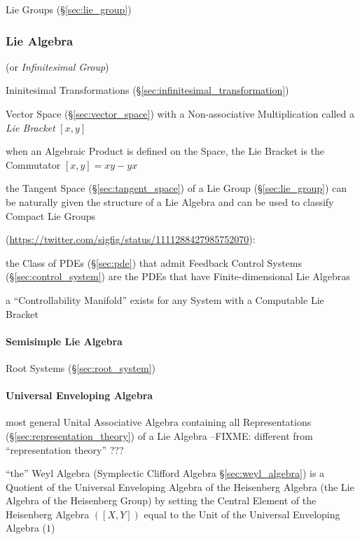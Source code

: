 Lie Groups (\S\ref{sec:lie_group})



\subsubsection{Lie Algebra}\label{sec:lie_algebra}

(or \emph{Infinitesimal Group})

Ininitesimal Transformations
(\S\ref{sec:infinitesimal_transformation})

Vector Space (\S\ref{sec:vector_space}) with a Non-associative
Multiplication called a \emph{Lie Bracket} $[x,y]$

when an Algebraic Product is defined on the Space, the Lie Bracket is
the Commutator $[x,y] = xy - yx$ %

the Tangent Space (\S\ref{sec:tangent_space}) of a Lie Group
(\S\ref{sec:lie_group}) can be naturally given the structure of a Lie Algebra
and can be used to classify Compact Lie Groups

(\url{https://twitter.com/sigfig/status/1111288427985752070}):

the Class of PDEs (\S\ref{sec:pde}) that admit Feedback Control Systems
(\S\ref{sec:control_system}) are the PDEs that have Finite-dimensional Lie
Algebras

a ``Controllability Manifold'' exists for any System with a Computable Lie
Bracket



\paragraph{Semisimple Lie Algebra}\label{sec:semisimple_lie}\hfill

Root Systems (\S\ref{sec:root_system})



\paragraph{Universal Enveloping Algebra}
\label{sec:universal_enveloping_algebra}\hfill

most general Unital Associative Algebra containing all Representations
(\S\ref{sec:representation_theory}) of a Lie Algebra
--FIXME: different from ``representation theory'' ???

\fist ``the'' Weyl Algebra (Symplectic Clifford Algebra
\S\ref{sec:weyl_algebra}) is a Quotient of the Universal Enveloping Algebra of
the Heisenberg Algebra (the Lie Algebra of the Heisenberg Group) by setting the
Central Element of the Heisenberg Algebra $([X,Y])$ equal to the Unit of the
Universal Enveloping Algebra ($1$)



